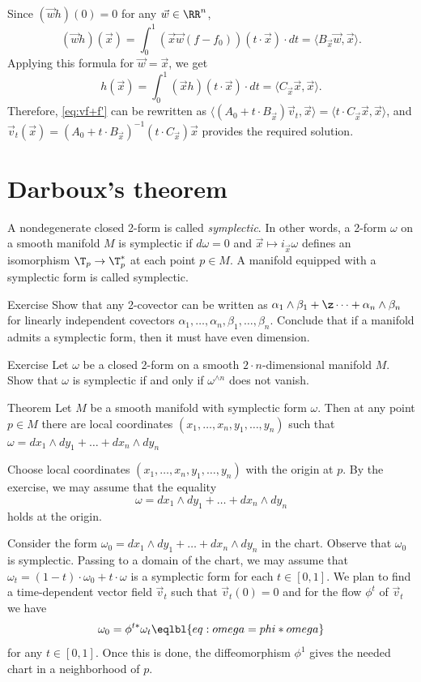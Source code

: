 Since $(\vec w h)(0)=0$ for any $\vec w\in\RR^n$,
\[
(\vec w h)(\vec x)= \int_0^1(\vec x\vec w (f-f_0))(t\cdot\vec x)\cdot dt=\langle B_{\vec x}\vec w,{\vec x}\rangle.
\]
Applying this formula for $\vec w=\vec x$, we get
\[
h({\vec x})= \int_0^1(\vec x h)(t\cdot\vec x)\cdot dt=\langle C_{\vec x}{\vec x},{\vec x}\rangle.
\]
Therefore, \ref{eq:vf+f'} can be rewritten as
$\langle(A_{0}+t\cdot B_{\vec x})\vec v_t,\vec x\rangle=\langle t\cdot C_{\vec x} \vec x,\vec x\rangle$,
and $\vec v_t(\vec x)=(A_{0}+t\cdot B_{\vec x})^{-1} (t\cdot C_{\vec x})\vec x$ provides the required solution.
\qeds


\section{Darboux's theorem}

A nondegenerate closed 2-form is called \emph{symplectic}.
In other words, a 2-form $\omega$ on a smooth manifold $M$ is symplectic if $d\omega=0$ and ${\vec x}\mapsto i_{\vec x}\omega$ defines an isomorphism $\T_p\to \T^*_p$ at each point $p\in M$.
A manifold equipped with a symplectic form is called symplectic.

\begin{thm}{Exercise}
Show that any 2-covector can be written as  $\alpha_1\wedge\beta_1+\z\dots+\alpha_n\wedge\beta_n$ for linearly independent covectors $\alpha_1,\dots,\alpha_n,\beta_1,\dots,\beta_n$.
Conclude that if a manifold admits a symplectic form, then it must have even dimension.
\end{thm}


\begin{thm}{Exercise}
Let $\omega$ be a closed 2-form on a smooth $2\cdot n$-dimensional manifold $M$.
Show that $\omega$ is symplectic if and only if $\omega^{\wedge n}$ does not vanish.
\end{thm}


\begin{thm}{Theorem}
Let $M$ be a smooth manifold with symplectic form $\omega$.
Then at any point $p\in M$ there are local coordinates $(x_1,\dots,x_n,y_1,\dots,y_n)$ such that
$\omega= dx_1\wedge dy_1+\dots+dx_n\wedge dy_n$
\end{thm}

Choose local coordinates $(x_1,\dots,x_n,y_1,\dots,y_n)$ with the origin at $p$.
By the exercise, we may assume that the equality
\[\omega=dx_1\wedge dy_1+\dots+dx_n\wedge dy_n\]
holds at the origin.

Consider the form $\omega_0=dx_1\wedge dy_1+\dots+dx_n\wedge dy_n$ in the chart.
Observe that $\omega_0$ is symplectic.
Passing to a domain of the chart, we may assume that $\omega_t=(1-t)\cdot\omega_0+t\cdot \omega$ is a symplectic form for each $t\in[0,1]$.
We plan to find a time-dependent vector field $\vec v_t$ such that $\vec v_t(0)=0$ and for the flow $\phi^t$ of $\vec v_t$ we have
\[\omega_0=\phi^{t*}\omega_t\eqlbl{eq:omega=phi*omega}\]
for any $t\in[0,1]$.
Once this is done, the diffeomorphism $\phi^1$ gives the needed chart in a neighborhood of $p$.

